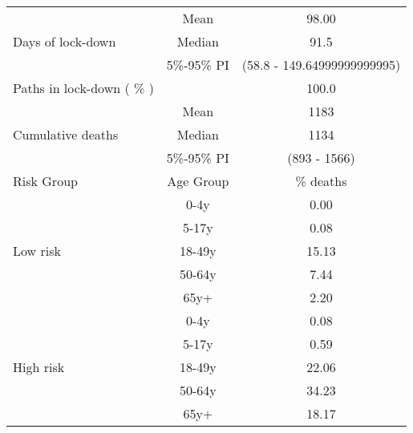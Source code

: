 \documentclass{article}
\begin{document}
\begin{table}[th]
\centering
\begin{tabular}{p{4cm}cc}
\toprule
\multirow{3}{*}{Days   of lock-down} & Mean      & 98.00                        \\ \cmidrule(l){2-3} 
                                     & Median    & 91.5                      \\ \cmidrule(l){2-3} 
                                     & 5\%-95\% PI & (58.8 - 149.64999999999995)       \\ \midrule 
\multirow{1}{*}{Paths in lock-down ( \% )} &      &         100.0              \\   \midrule                     
\multirow{3}{\hsize}{Cumulative deaths}       & Mean      & 1183 \\ \cmidrule(l){2-3} 
                                     & Median    & 1134                        \\ \cmidrule(l){2-3} 
                                     & 5\%-95\% PI & (893 - 1566)           \\  \midrule
Risk Group                           & Age Group & \multicolumn{1}{c}{\% deaths}        \\  \midrule
\multirow{5}{*}{Low   risk}          & 0-4y      & 0.00                         \\ \cmidrule(l){2-3} 
                                     & 5-17y     & 0.08                         \\ \cmidrule(l){2-3} 
                                     & 18-49y    & 15.13                         \\ \cmidrule(l){2-3} 
                                     & 50-64y    & 7.44                         \\ \cmidrule(l){2-3} 
                                     & 65y+      & 2.20                         \\ \midrule
\multirow{5}{*}{High   risk}         & 0-4y      & 0.08                         \\ \cmidrule(l){2-3} 
                                     & 5-17y     & 0.59                         \\ \cmidrule(l){2-3} 
                                     & 18-49y    & 22.06                         \\ \cmidrule(l){2-3} 
                                     & 50-64y    & 34.23                         \\ \cmidrule(l){2-3} 
                                     & 65y+      & 18.17                         \\ \midrule

\end{tabular}
\end{table}
\end{document}
